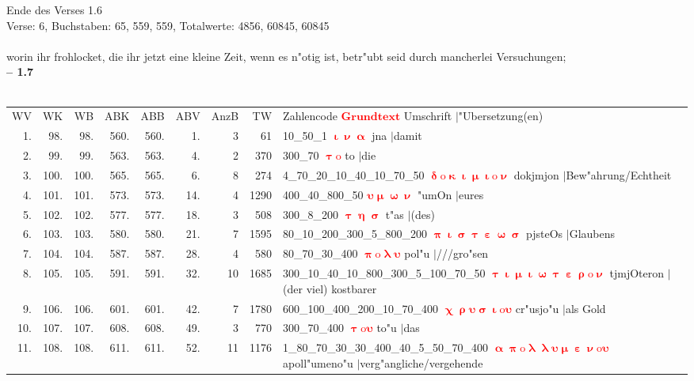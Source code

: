 \documentclass[a4paper,10pt,landscape]{article}
\begin{document}
Ende des Verses 1.6\\
Verse: 6, Buchstaben: 65, 559, 559, Totalwerte: 4856, 60845, 60845\\
\\
worin ihr frohlocket, die ihr jetzt eine kleine Zeit, wenn es n"otig ist, betr"ubt seid durch mancherlei Versuchungen;\\
\newpage 
{\bf -- 1.7}\\
\medskip \\
\begin{tabular}{rrrrrrrrp{120mm}}
WV&WK&WB&ABK&ABB&ABV&AnzB&TW&Zahlencode \textcolor{red}{$\boldsymbol{Grundtext}$} Umschrift $|$"Ubersetzung(en)\\
1.&98.&98.&560.&560.&1.&3&61&10\_50\_1 \textcolor{red}{$\boldsymbol{\upiota\upnu\upalpha}$} jna $|$damit\\
2.&99.&99.&563.&563.&4.&2&370&300\_70 \textcolor{red}{$\boldsymbol{\uptau\mathrm{o}}$} to $|$die\\
3.&100.&100.&565.&565.&6.&8&274&4\_70\_20\_10\_40\_10\_70\_50 \textcolor{red}{$\boldsymbol{\updelta\mathrm{o}\upkappa\upiota\upmu\upiota\mathrm{o}\upnu}$} dokjmjon $|$Bew"ahrung/Echtheit\\
4.&101.&101.&573.&573.&14.&4&1290&400\_40\_800\_50 \textcolor{red}{$\boldsymbol{\upsilon\upmu\upomega\upnu}$} "umOn $|$eures\\
5.&102.&102.&577.&577.&18.&3&508&300\_8\_200 \textcolor{red}{$\boldsymbol{\uptau\upeta\upsigma}$} t"as $|$(des)\\
6.&103.&103.&580.&580.&21.&7&1595&80\_10\_200\_300\_5\_800\_200 \textcolor{red}{$\boldsymbol{\uppi\upiota\upsigma\uptau\upepsilon\upomega\upsigma}$} pjsteOs $|$Glaubens\\
7.&104.&104.&587.&587.&28.&4&580&80\_70\_30\_400 \textcolor{red}{$\boldsymbol{\uppi\mathrm{o}\uplambda\upsilon}$} pol"u $|$///gro"sen\\
8.&105.&105.&591.&591.&32.&10&1685&300\_10\_40\_10\_800\_300\_5\_100\_70\_50 \textcolor{red}{$\boldsymbol{\uptau\upiota\upmu\upiota\upomega\uptau\upepsilon\uprho\mathrm{o}\upnu}$} tjmjOteron $|$(der viel) kostbarer\\
9.&106.&106.&601.&601.&42.&7&1780&600\_100\_400\_200\_10\_70\_400 \textcolor{red}{$\boldsymbol{\upchi\uprho\upsilon\upsigma\upiota\mathrm{o}\upsilon}$} cr"usjo"u $|$als Gold\\
10.&107.&107.&608.&608.&49.&3&770&300\_70\_400 \textcolor{red}{$\boldsymbol{\uptau\mathrm{o}\upsilon}$} to"u $|$das\\
11.&108.&108.&611.&611.&52.&11&1176&1\_80\_70\_30\_30\_400\_40\_5\_50\_70\_400 \textcolor{red}{$\boldsymbol{\upalpha\uppi\mathrm{o}\uplambda\uplambda\upsilon\upmu\upepsilon\upnu\mathrm{o}\upsilon}$} apoll"umeno"u $|$verg"angliche/vergehende\\

\end{tabular}
\end{document}
